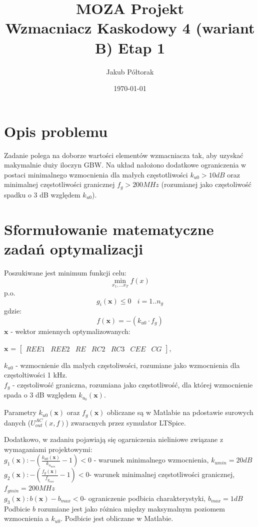 \documentclass{article}
\title{\huge  \Huge \textbf{MOZA Projekt} \\ \textbf{Wzmacniacz Kaskodowy 4 (wariant B)}}
\date{\today}
\author{ \LARGE Jakub Półtorak}
\begin{document}
\maketitle
{}
\newpage
{}
\tableofcontents

\pagebreak

\begin{center}
	\title{ \huge \textbf{Etap 1}}
\end{center}


\section{Opis problemu}
Zadanie polega na doborze wartości elementów wzmacniacza tak, aby uzyskać makymalnie duży iloczyn
GBW. Na układ nałożono dodatkowe ograniczenia w postaci minimalnego wzmocnienia dla małych częstotliwości $k_{u0} > 10 dB$ oraz minimalnej częstotliwości
granicznej $f_g > 200 MHz$ (rozumianej jako częstoliwość spadku o 3 dB względem $k_{u0}$).
\section{Sformułowanie matematyczne zadań optymalizacji}
Poszukiwane jest minimum funkcji celu:
\[ \min\limits_{x_1,\dots x_T} f(x) \]
p.o.
\[ g_{i}(\textbf{x}) \leq 0 \ \ \ \  i=1..n_g\]
gdzie:
\[ f(\textbf{x}) = -(k_{u0}\cdot f_g)\]
\(\textbf{x}\) - wektor zmiennych optymalizowanych: \\
\begin{center}
	$\textbf{x}$ =
	$\begin{bmatrix}
			REE1 & REE2 & RE & RC2 & RC3 & CEE & CG
		\end{bmatrix}$,
\end{center}
\(k_{u0}\) - wzmocnienie dla małych częstoliwości, rozumiane jako wzmocnienia dla częstoltiwości 1 kHz.\\
\(f_{g}\) - częstoliwość graniczna, rozumiana jako częstotliwość, dla której wzmocnienie
spada o 3 dB względem $k_{u_{0}}(\textbf{x}) $.

Parametry $k_{u0}(\textbf{x})$ oraz $f_g(\textbf{x})$ obliczane są w Matlabie na pdostawie surowych danych ($U^{AC}_{out}(x,f)$) zwaracnych
przez symulator LTSpice.

Dodatkowo, w zadaniu pojawiają się ogarniczenia nieliniowe związane z wymaganiami projektowymi:\\
\(g_1(\textbf{x}): -(\frac{k_{u0}(\textbf{x})}{k_{u_{min}}}-1) <  0\) - warunek minimalnego wzmocnienia, $k_{umin}=20dB$\\
\(g_2(\textbf{x}): -(\frac{{f_g}(\textbf{x})}{f_{g_{min}}}-1)<0\)- warunek minimalnej częstotliwości granicznej, $f_{gmin}=200 MHz$\\
\(g_3(\textbf{x}): b(\textbf{x})-b_{max}<0\)- ograniczenie podbicia charakterystyki, $b_{max}=1dB$\\ Podbicie $b$ rozumiane jest jako różnica między maksymalnym poziomem wzmocnienia a $k_{u0}$.
Podbicie jest obliczane w Matlabie.
\end{document}
